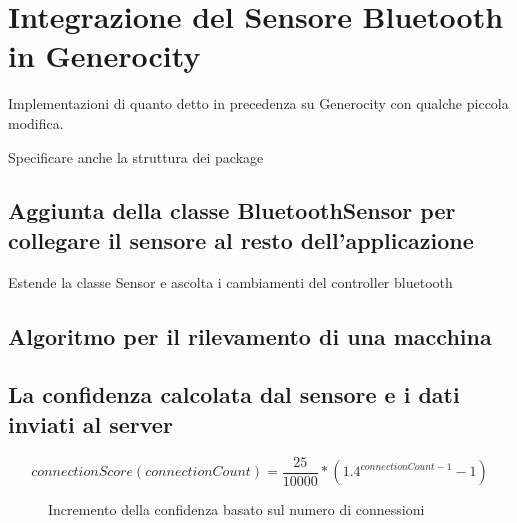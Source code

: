 \chapter{Integrazione del Sensore Bluetooth in Generocity}
Implementazioni di quanto detto in precedenza su Generocity con qualche piccola modifica.

Specificare anche la struttura dei package

\section{Aggiunta della classe BluetoothSensor per collegare il sensore al resto dell'applicazione}
Estende la classe Sensor e ascolta i cambiamenti del controller bluetooth

\section{Algoritmo per il rilevamento di una macchina}

\section{La confidenza calcolata dal sensore e i dati inviati al server}
\[connectionScore(connectionCount) = \frac{25}{10000} * (1.4^{connectionCount-1} - 1)\]

\begin{figure}[t]
    \centering
    \caption{Incremento della confidenza basato sul numero di connessioni}
    \label{fig:confidence-func}
\end{figure}